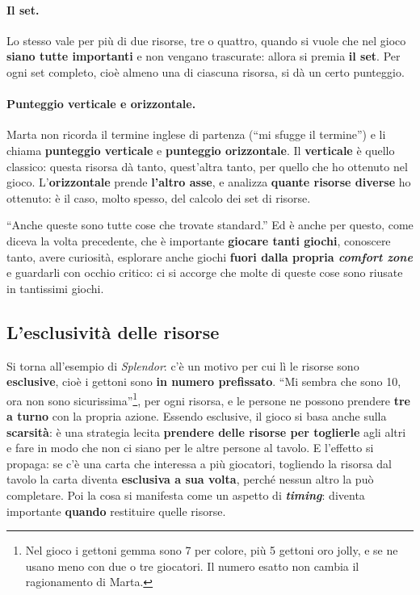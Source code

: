 \paragraph{Il set.} Lo stesso vale per più di due risorse, tre o quattro, quando si vuole che
nel gioco \textbf{siano tutte importanti} e non vengano trascurate: allora si premia
\textbf{il set}. Per ogni set completo, cioè almeno una di ciascuna risorsa, si dà un certo
punteggio.

\paragraph{Punteggio verticale e orizzontale.} Marta non ricorda il termine inglese di
partenza (``mi sfugge il termine'') e li chiama \textbf{punteggio verticale} e
\textbf{punteggio orizzontale}. Il \textbf{verticale} è quello classico: questa risorsa dà
tanto, quest'altra tanto, per quello che ho ottenuto nel gioco. L'\textbf{orizzontale} prende
\textbf{l'altro asse}, e analizza \textbf{quante risorse diverse} ho ottenuto: è il caso, molto
spesso, del calcolo dei set di risorse.

``Anche queste sono tutte cose che trovate standard.'' Ed è anche per questo, come diceva la
volta precedente, che è importante \textbf{giocare tanti giochi}, conoscere tanto, avere
curiosità, esplorare anche giochi \textbf{fuori dalla propria \emph{comfort zone}} e
guardarli con occhio critico: ci si accorge che molte di queste cose sono riusate in
tantissimi giochi.

\subsection{L'esclusività delle risorse}

Si torna all'esempio di \emph{Splendor}: c'è un motivo per cui lì le risorse sono
\textbf{esclusive}, cioè i gettoni sono \textbf{in numero prefissato}. ``Mi sembra che sono
10, ora non sono sicurissima''\footnote{Nel gioco i gettoni gemma sono 7 per colore, più 5
gettoni oro jolly, e se ne usano meno con due o tre giocatori. Il numero esatto non cambia il
ragionamento di Marta.}, per ogni risorsa, e le persone ne possono prendere \textbf{tre a turno}
con la propria azione. Essendo esclusive, il gioco si basa anche sulla \textbf{scarsità}: è una
strategia lecita \textbf{prendere delle risorse per toglierle} agli altri e fare in modo che
non ci siano per le altre persone al tavolo. E l'effetto si propaga: se c'è una carta che
interessa a più giocatori, togliendo la risorsa dal tavolo la carta diventa \textbf{esclusiva a
sua volta}, perché nessun altro la può completare. Poi la cosa si manifesta come un aspetto di
\textbf{\emph{timing}}: diventa importante \textbf{quando} restituire quelle risorse.

